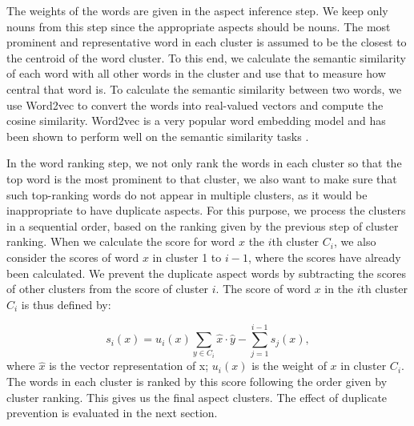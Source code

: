 The weights of the words are given in the aspect inference step.
We keep only nouns from this step since the appropriate aspects 
should be nouns. The most prominent and representative word in each cluster
is assumed to be the closest to the centroid of the word cluster.
To this end, we calculate the semantic similarity of each word with all other 
words in the cluster and use that to measure how central that word is.
To calculate the semantic similarity between two words, 
we use Word2vec to convert the words into real-valued vectors and 
compute the cosine similarity. Word2vec is a very popular 
word embedding model and has been shown to perform well on 
the semantic similarity tasks \cite{levy2015improving}.

In the word ranking step, we not only rank the words in each cluster so that
the top word is the most prominent to that cluster, 
we also want to make sure that such top-ranking words do not appear in
multiple clusters, as it would be inappropriate to have duplicate aspects. 
For this purpose, we process the clusters in a sequential order, 
based on the ranking given by the previous step of cluster ranking.
When we calculate the score for word $x$ the $i$th cluster $C_i$,
we also consider the scores of word $x$ in cluster 1 to $i-1$, 
where the scores have already been calculated. 
We prevent the duplicate aspect words by subtracting the scores 
of other clusters from the score of cluster $i$.
The score of word $x$ in the $i$th cluster $C_i$ is thus defined by:

\begin{equation}
s_i(x) = u_i(x) \sum_{y\in C_i}\hat{x}\cdot \hat{y} - \sum_{j=1}^{i-1}s_j(x),
\label{eq:wordscore}
\end{equation}
where $\hat{x}$ is the vector representation of x; $u_i(x)$ is the weight of $x$ in cluster $C_i$.
The words in each cluster is ranked by this score following the order given by cluster ranking.
This gives us the final aspect clusters. 
The effect of duplicate prevention is evaluated in the next section.
